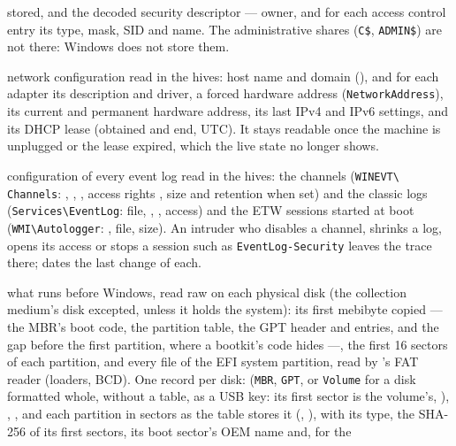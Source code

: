 \documentclass[11pt,a4paper,oneside]{report}
\begin{document}
\begin{description}[style=nextline,leftmargin=1.2em]
        stored, and the decoded security descriptor --- owner, and for each
        access control entry its type, mask, SID and name. The administrative
        shares (\texttt{C\$}, \texttt{ADMIN\$}) are not there: Windows does not
        store them.
  \item[\fichier{network\_configuration.json}] network configuration read in
        the hives: host name and domain (), and for each adapter
        its description and driver, a forced hardware address
        (\texttt{NetworkAddress}), its current and permanent hardware address,
        its last IPv4 and IPv6 settings, and its DHCP lease (obtained and end,
        UTC). It stays readable once the machine is unplugged or the lease
        expired, which the live state no longer shows.
  \item[\fichier{event\_log\_configuration.json}] configuration of every event
        log read in the hives: the channels (\texttt{WINEVT\textbackslash
        Channels}: , , ,
        access rights , size and retention when set) and
        the classic logs (\texttt{Services\textbackslash EventLog}: file,
        , , access) and the ETW sessions
        started at boot (\texttt{WMI\textbackslash Autologger}: ,
        file, size). An intruder who disables a channel, shrinks a log, opens
        its access or stops a session such as \texttt{EventLog-Security} leaves
        the trace there;
         dates the last change of each.
  \item[\fichier{boot\_records.json}] what runs before Windows, read raw on
        each physical disk (the collection medium's disk excepted, unless it
        holds the system): its first
        mebibyte copied — the MBR's boot code, the partition table, the GPT
        header and entries, and the gap before the first partition, where a
        bootkit's code hides —, the first 16 sectors of each partition, and
        every file of the EFI system partition, read by \wac{}'s FAT reader
        (loaders, BCD). One record per disk: 
        (\texttt{MBR}, \texttt{GPT}, or \texttt{Volume} for a disk formatted
        whole, without a table, as a USB key: its first sector is the
        volume's, ), ,
        , and each partition in sectors as the table
        stores it (, ), with its type, the
        SHA-256 of its first sectors, its boot sector's OEM name and, for the

\end{description}
\end{document}

